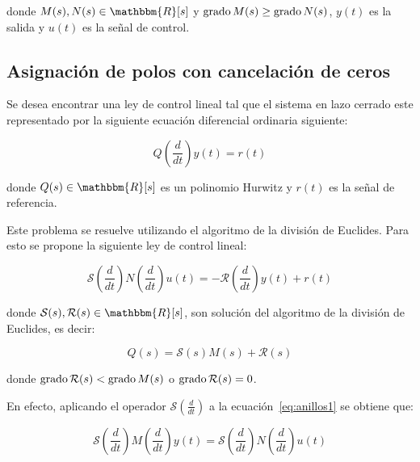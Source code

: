         donde $M(s), N(s) \in \mathbbm{R}[s]$ y $\operatorname{grado}{M(s)} \ge \operatorname{grado}{N(s)}$, $y(t)$ es la salida y $u(t)$ es la señal de control.

        \subsection{Asignación de polos con cancelación de ceros}

            Se desea encontrar una ley de control lineal tal que el sistema en lazo cerrado este representado por la siguiente ecuación diferencial ordinaria siguiente:

            \begin{equation}
                Q \left( \frac{d}{dt} \right) y(t) = r(t)
            \end{equation}

            donde $Q(s) \in \mathbbm{R}[s]$ es un polinomio Hurwitz y $r(t)$ es la señal de referencia.

            Este problema se resuelve utilizando el algoritmo de la división de Euclides. Para esto se propone la siguiente ley de control lineal:

            \begin{equation} \label{eq:anillos2}
                \mathcal{S} \left( \frac{d}{dt} \right) N \left( \frac{d}{dt} \right) u(t) = - \mathcal{R} \left( \frac{d}{dt} \right) y(t) + r(t)
            \end{equation}

            donde $\mathcal{S}(s), \mathcal{R}(s) \in \mathbbm{R}[s]$, son solución del algoritmo de la división de Euclides, es decir:

            \begin{equation} \label{eq:anillos3}
                Q(s) = \mathcal{S}(s) M(s) + \mathcal{R}(s)
            \end{equation}

            donde $\operatorname{grado}{\mathcal{R}(s)} < \operatorname{grado}{M(s)}$ o $\operatorname{grado}{\mathcal{R}(s)} = 0$.

            En efecto, aplicando el operador $\mathcal{S} \left( \frac{d}{dt} \right)$ a la ecuación~\ref{eq:anillos1} se obtiene que:

            \begin{equation*}
                \mathcal{S} \left( \frac{d}{dt} \right) M \left( \frac{d}{dt} \right) y(t) = \mathcal{S} \left( \frac{d}{dt} \right) N \left( \frac{d}{dt} \right) u(t)
            \end{equation*}

